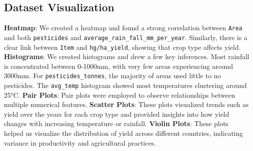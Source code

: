 \documentclass[10pt,twocolumn,letterpaper]{article}
\begin{document}
\subsection{Dataset Visualization}
      \textbf{Heatmap}: We created a heatmap and found a strong correlation between \texttt{Area} and both \texttt{pesticides} and \texttt{average\_rain\_fall\_mm\_per\_year}. Similarly, there is a clear link between \texttt{Item} and \texttt{hg/ha\_yield}, showing that crop type affects yield.
    \textbf{Histograms}: We created histograms and drew a few key inferences. Most rainfall is concentrated between 0-1000mm, with very few areas experiencing around 3000mm. For \texttt{pesticides\_tonnes}, the majority of areas used little to no pesticides. The \texttt{avg\_temp} histogram showed most temperatures clustering around 25°C.
    \textbf{Pair Plots}: Pair plots were employed to observe relationships between multiple numerical features.
        \textbf{Scatter Plots}: These plots visualized trends such as yield over the years for each crop type and provided insights into how yield changes with increasing temperature or rainfall.
      \textbf{Violin Plots}: These plots helped us visualize the distribution of yield across different countries, indicating variance in productivity and agricultural practices.
\end{document}
